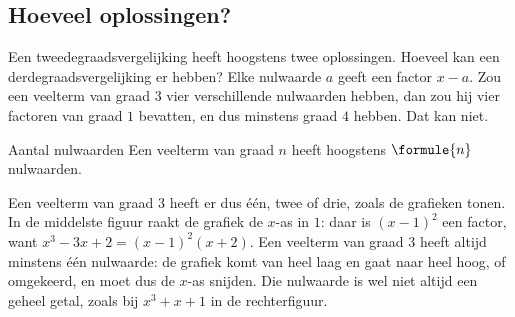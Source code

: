 \begin{oefeningen}
\end{oefeningen}

\subsection{Hoeveel oplossingen?}

Een tweedegraadsvergelijking heeft hoogstens twee oplossingen. Hoeveel kan een derdegraadsvergelijking er hebben? Elke nulwaarde $a$ geeft een factor $x - a$. Zou een veelterm van graad $3$ vier verschillende nulwaarden hebben, dan zou hij vier factoren van graad $1$ bevatten, en dus minstens graad $4$ hebben. Dat kan niet.

\begin{theorie}
\begin{stelling}{Aantal nulwaarden}
Een veelterm van graad $n$ heeft hoogstens $\formule{n}$ nulwaarden.
\end{stelling}
\end{theorie}


Een veelterm van graad $3$ heeft er dus één, twee of drie, zoals de grafieken tonen. In de middelste figuur raakt de grafiek de $x$-as in $1$: daar is $(x - 1)^2$ een factor, want $x^3 - 3x + 2 = (x - 1)^2(x + 2)$. Een veelterm van graad $3$ heeft altijd minstens één nulwaarde: de grafiek komt van heel laag en gaat naar heel hoog, of omgekeerd, en moet dus de $x$-as snijden. Die nulwaarde is wel niet altijd een geheel getal, zoals bij $x^3 + x + 1$ in de rechterfiguur.

\begin{oefeningen}
\end{oefeningen}


